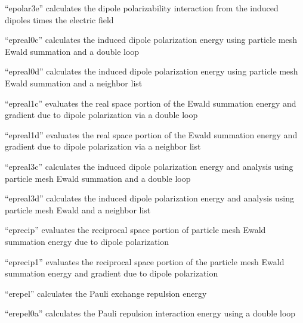 \documentclass[letterpaper,11pt,english]{sphinxmanual}
\begin{document}
“epolar3e” calculates the dipole polarizability interaction
from the induced dipoles times the electric field


“epreal0c” calculates the induced dipole polarization energy
using particle mesh Ewald summation and a double loop


“epreal0d” calculates the induced dipole polarization energy
using particle mesh Ewald summation and a neighbor list


“epreal1c” evaluates the real space portion of the Ewald
summation energy and gradient due to dipole polarization
via a double loop


“epreal1d” evaluates the real space portion of the Ewald
summation energy and gradient due to dipole polarization
via a neighbor list


“epreal3c” calculates the induced dipole polarization energy and
analysis using particle mesh Ewald summation and a double loop


“epreal3d” calculates the induced dipole polarization energy
and analysis using particle mesh Ewald and a neighbor list


“eprecip” evaluates the reciprocal space portion of particle
mesh Ewald summation energy due to dipole polarization


“eprecip1” evaluates the reciprocal space portion of the particle
mesh Ewald summation energy and gradient due to dipole polarization



“erepel” calculates the Pauli exchange repulsion energy


“erepel0a” calculates the Pauli repulsion interaction energy
using a double loop

\end{document}
